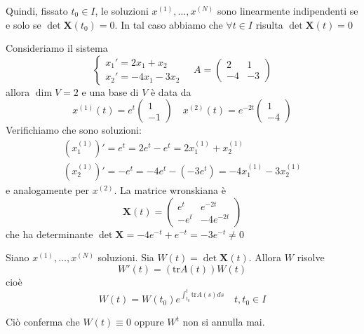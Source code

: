 Quindi, fissato \(t_{0} \in I\), le soluzioni \(x^{{(1)}}, \dots, x^{{(N)}}\)
sono linearmente indipendenti se e solo se \(\det \mathbf{X} {(t_{0})} = 0\). In
tal caso abbiamo che \(\forall t \in I\) risulta \(\det \mathbf{X}{(t)} = 0\)
\begin{example}
    Consideriamo il sistema
    \[
      \begin{cases}
          x_{1}' = 2x_{1} + x_{2} \\
          x_{2}' = -4x_{1} - 3x_{2}
      \end{cases}
      \quad
      A = \begin{pmatrix}
          2 & 1 \\
          -4 & -3
      \end{pmatrix}
    \]
    allora \(\dim V = 2\) e una base di \(V\) è data da
    \[
      x^{{(1)}}{(t)} = e^{t} \begin{pmatrix}
          1 \\
          -1
      \end{pmatrix} \quad x^{( 2 )}{(t)} = e^{-2t} \begin{pmatrix}
          1 \\
          -4
      \end{pmatrix}
    \]
    Verifichiamo che sono soluzioni:
    \begin{align*}
        {\left(x^{{(1)}}_1\right)}' = e^{t} = 2e^{t} - e^{t} = 2x^{{(1)}}_{1} +
        x^{{(1)}}_{2} \\
    {\left(x_{2}^{{(1)}}\right)}' = -e^{t} = -4e^{t} -(- 3e^{t}) = -4x^{{(1)}}_{1} -
        3x^{{(1)}}_2
    \end{align*}
    e analogamente per \(x^{(2)}\). La matrice wronskiana è
    \[
      \mathbf{X}{(t)} = \begin{pmatrix}
          e^{t} & e^{-2t} \\
          -e^{t} & -4e^{-2t}
      \end{pmatrix}
    \]
    che ha determinante \(\det \mathbf{X} = -4e^{-t} + e^{-t} = -3 e^{-t} \neq 0\) 
\end{example}
\begin{theorem}[Liouville]\label{thm:liouville_wronskiano}
    Siano \(x^{{(1)}}, \dots, x^{{(N)}}\) soluzioni. Sia \(W{(t)} = \det
    \mathbf{X} {(t)}\). Allora \(W\) risolve 
    \[
        W'{(t)} = {(\text{tr} A{(t)})} W{(t)}
    \]
    cioè 
    \[
        W{(t)} = W{(t_{0})} e^{\int_{t_{0}}^{t} \text{tr} A{(s)} ds} \quad t, t_{0}
        \in I
    \]
\end{theorem}
Ciò conferma che \(W{(t)} \equiv 0\) oppure \(W^{t}\) non si annulla mai.

